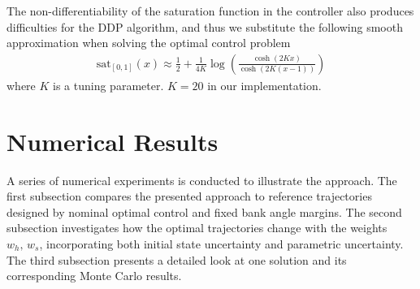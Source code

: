 \documentclass[journal ]{new-aiaa}
\begin{document}
The non-differentiability of the saturation function in the controller also produces difficulties for the DDP algorithm, and thus we substitute the following smooth approximation when solving the optimal control problem
\begin{align*}
\mathrm{sat}_{[0,1]}(x) \approx \frac{1}{2} + \frac{1}{4K}\log\left(\frac{\cosh (2Kx)}{\cosh (2K(x-1))}\right) 
\end{align*}
where $K$ is a tuning parameter. $K=20$ in our implementation.


\section*{Numerical Results}
A series of numerical experiments is conducted to illustrate the approach. The first subsection compares the presented approach to reference trajectories designed by nominal optimal control and fixed bank angle margins. The second subsection investigates how the optimal trajectories change with the weights $w_h,\,w_s$, incorporating both initial state uncertainty and parametric uncertainty. The third subsection presents a detailed look at one solution and its corresponding Monte Carlo results.
\end{document}
